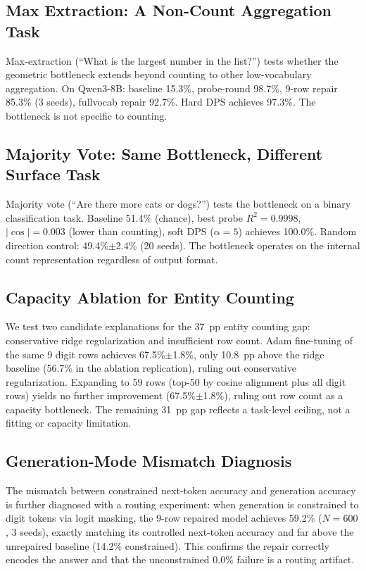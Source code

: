 \documentclass{article}
\begin{document}
\subsection{Max Extraction: A Non-Count Aggregation Task}
\label{sec:max_extraction}

Max-extraction (``What is the largest number in the list?'') tests whether the
geometric bottleneck extends beyond counting to other low-vocabulary
aggregation. On Qwen3-8B: baseline 15.3\%, probe-round 98.7\%, 9-row repair
85.3\% (3 seeds), fullvocab repair 92.7\%. Hard DPS achieves 97.3\%. The
bottleneck is not specific to counting.

\subsection{Majority Vote: Same Bottleneck, Different Surface Task}
\label{sec:majority_vote}

Majority vote (``Are there more cats or dogs?'') tests the bottleneck on a
binary classification task. Baseline 51.4\% (chance), best probe $R^2 =
0.9998$, $|\cos| = 0.003$ (lower than counting), soft DPS ($\alpha{=}5$)
achieves 100.0\%. Random direction control: 49.4\%$\pm$2.4\% (20 seeds). The
bottleneck operates on the internal count representation regardless of output
format.

\subsection{Capacity Ablation for Entity Counting}
\label{sec:capacity_ablation}

We test two candidate explanations for the 37~pp entity counting gap:
conservative ridge regularization and insufficient row count. Adam fine-tuning
of the same 9 digit rows achieves 67.5\%$\pm$1.8\%, only 10.8~pp above the
ridge baseline (56.7\% in the ablation replication), ruling out conservative
regularization. Expanding to 59 rows (top-50 by cosine alignment plus all digit
rows) yields no further improvement (67.5\%$\pm$1.8\%), ruling out row count
as a capacity bottleneck. The remaining 31~pp gap reflects a task-level ceiling,
not a fitting or capacity limitation.

\subsection{Generation-Mode Mismatch Diagnosis}
\label{sec:genmode_mismatch}

The mismatch between constrained next-token accuracy and generation accuracy is
further diagnosed with a routing experiment: when generation is constrained to
digit tokens via logit masking, the 9-row repaired model achieves 59.2\%
($N{=}600$, 3 seeds), exactly matching its controlled next-token accuracy and
far above the unrepaired baseline (14.2\% constrained). This confirms the
repair correctly encodes the answer and that the unconstrained 0.0\% failure is
a routing artifact.
\end{document}
